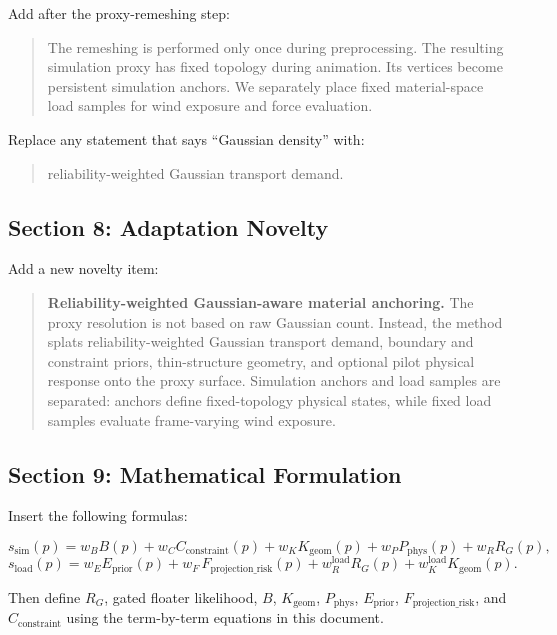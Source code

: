 \documentclass[11pt,a4paper]{article}
\begin{document}
Add after the proxy-remeshing step:

\begin{quote}
The remeshing is performed only once during preprocessing. The resulting simulation proxy has fixed topology during animation. Its vertices become persistent simulation anchors. We separately place fixed material-space load samples for wind exposure and force evaluation.
\end{quote}

Replace any statement that says ``Gaussian density'' with:

\begin{quote}
reliability-weighted Gaussian transport demand.
\end{quote}

\subsection{Section 8: Adaptation Novelty}

Add a new novelty item:

\begin{quote}
\textbf{Reliability-weighted Gaussian-aware material anchoring.} The proxy resolution is not based on raw Gaussian count. Instead, the method splats reliability-weighted Gaussian transport demand, boundary and constraint priors, thin-structure geometry, and optional pilot physical response onto the proxy surface. Simulation anchors and load samples are separated: anchors define fixed-topology physical states, while fixed load samples evaluate frame-varying wind exposure.
\end{quote}

\subsection{Section 9: Mathematical Formulation}

Insert the following formulas:

\[
s_{\mathrm{sim}}(p)=
 w_B B(p)+w_C C_{\mathrm{constraint}}(p)+w_K K_{\mathrm{geom}}(p)+w_P P_{\mathrm{phys}}(p)+w_R R_G(p),
\]
\[
s_{\mathrm{load}}(p)=w_E E_{\mathrm{prior}}(p)+w_F \, F_{\mathrm{projection\_risk}}(p)+w_R^{\mathrm{load}}R_G(p)+w_K^{\mathrm{load}}K_{\mathrm{geom}}(p).
\]

Then define $R_G$, gated floater likelihood, $B$, $K_{\mathrm{geom}}$, $P_{\mathrm{phys}}$, $E_{\mathrm{prior}}$, $F_{\mathrm{projection\_risk}}$, and $C_{\mathrm{constraint}}$ using the term-by-term equations in this document.
\end{document}
